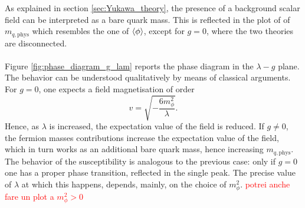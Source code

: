 As explained in section \ref{sec:Yukawa_theory}, the presence of a background scalar field can be interpreted as a bare quark mass. This is reflected in the plot of of $m_{q, \text{phys}}$ which resembles the one of $\left\langle \phi \right\rangle$, except for $g=0$, where the two theories are disconnected. \\~\\
Figure \ref{fig:phase_diagram_g_lam} reports the phase diagram in the $\lambda - g$ plane. The behavior can be understood qualitatively by means of classical arguments. 
For $g=0$, one expects a field magnetisation of order 
\begin{equation*}
    v = \sqrt{-\frac{6 m_\phi^2}{\lambda}}.
\end{equation*}
Hence, as $\lambda$ is increased, the expectation value of the field is reduced.
If $g \neq 0$, the fermion masses contributions increase the expectation value of the field, which in turn works as an additional bare quark mass, hence increasing $m_{q, \text{phys}}$. The behavior of the susceptibility is analogous to the previous case: only if $g=0$ one has a proper phase transition, reflected in the single peak.
The precise value of $\lambda$ at which this happens, depends, mainly, on the choice of $m_\phi^2$. \textcolor{red}{potrei anche fare un plot a $m_\phi^2 > 0$}
